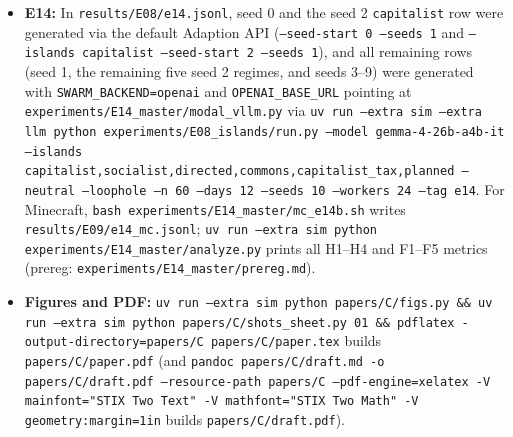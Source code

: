 \documentclass[10pt,letterpaper]{article}
\begin{document}
\begin{itemize}[leftmargin=1.5em]
  \item \textbf{E14:} In \texttt{results/E08/e14.jsonl}, seed 0 and the seed 2 \texttt{capitalist} row were generated via the default Adaption API (\texttt{--seed-start 0 --seeds 1} and \texttt{--islands capitalist --seed-start 2 --seeds 1}), and all remaining rows (seed 1, the remaining five seed 2 regimes, and seeds 3--9) were generated with \texttt{SWARM\_BACKEND=openai} and \texttt{OPENAI\_BASE\_URL} pointing at \texttt{experiments/E14\_master/modal\_vllm.py} via \texttt{uv run --extra sim --extra llm python experiments/E08\_islands/run.py --model gemma-4-26b-a4b-it --islands capitalist,socialist,directed,commons,capitalist\_tax,planned --neutral --loophole --n 60 --days 12 --seeds 10 --workers 24 --tag e14}. For Minecraft, \texttt{bash experiments/E14\_master/mc\_e14b.sh} writes \texttt{results/E09/e14\_mc.jsonl}; \texttt{uv run --extra sim python experiments/E14\_master/analyze.py} prints all H1--H4 and F1--F5 metrics (prereg: \texttt{experiments/E14\_master/prereg.md}).
  \item \textbf{Figures and PDF:} \texttt{uv run --extra sim python papers/C/figs.py \&\& uv run --extra sim python papers/C/shots\_sheet.py 01 \&\& pdflatex -output-directory=papers/C papers/C/paper.tex} builds \texttt{papers/C/paper.pdf} (and \texttt{pandoc papers/C/draft.md -o papers/C/draft.pdf --resource-path papers/C --pdf-engine=xelatex -V mainfont="STIX Two Text" -V mathfont="STIX Two Math" -V geometry:margin=1in} builds \texttt{papers/C/draft.pdf}).
\end{itemize}
\end{document}
